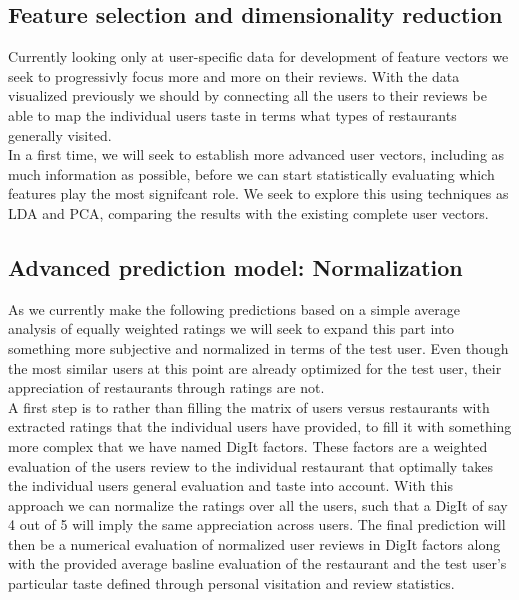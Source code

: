 \documentclass[10pt,twocolumn,letterpaper]{article}
\begin{document}
\subsection{Feature selection and dimensionality reduction}
Currently looking only at user-specific data for development of feature vectors we seek to progressivly focus more and more on their reviews. With the data visualized previously we should by connecting all the users to their reviews be able to map the individual users taste in terms what types of restaurants generally visited. 
\\[.5em]
\indent In a first time, we will seek to establish more advanced user vectors, including as much information as possible, before we can start statistically evaluating which features play the most signifcant role. We seek to explore this using techniques as LDA and PCA, comparing the results with the existing complete user vectors.

\subsection{Advanced prediction model: Normalization}
As we currently make the following predictions based on a simple average analysis of equally weighted ratings we will seek to expand this part into something more subjective and normalized in terms of the test user. Even though the most similar users at this point are already optimized for the test user, their appreciation of restaurants through ratings are not. \\[.5em]
\indent A first step is to rather than filling the matrix of users versus restaurants with extracted ratings that the individual users have provided, to fill it with something more complex that we have named DigIt factors. These factors are a weighted evaluation of the users review to the individual restaurant that optimally takes the individual users general evaluation and taste into account. With this approach we can normalize the ratings over all the users, such that a DigIt of say 4 out of 5 will imply the same appreciation across users. The final prediction will then be a numerical evaluation of normalized user reviews in DigIt factors along with the provided average basline evaluation of the restaurant and the test user's particular taste defined through personal visitation and review statistics.
\end{document}

